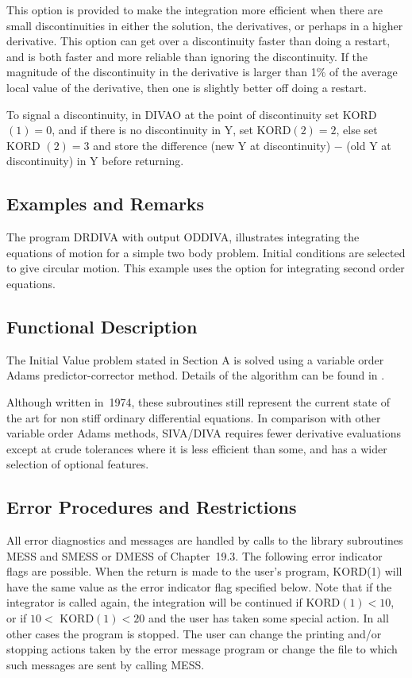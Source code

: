 \documentclass[twoside]{MATH77}
\begin{document}
This option is provided to make the integration more efficient when there
are small discontinuities in either the solution, the derivatives, or
perhaps in a higher derivative. This option can get over a discontinuity
faster than doing a restart, and is both faster and more reliable than
ignoring the discontinuity. If the magnitude of the discontinuity in the
derivative is larger than 1\% of the average local value of the
derivative, then one is slightly better off doing a restart.

To signal a discontinuity, in DIVAO at the point of discontinuity set KORD$%
(1)=0$, and if there is no discontinuity in Y, set KORD$(2)=2$, else set KORD%
$(2)=3$ and store the difference (new Y at discontinuity) $-$ (old Y at
discontinuity) in Y before returning.

\subsection{Examples and Remarks}

The program DRDIVA with output ODDIVA, illustrates integrating the
equations of motion for a simple two body problem.
Initial conditions are selected to give circular motion. This example
uses the option for integrating second order equations.

\subsection{Functional Description}

The Initial Value problem stated in Section A is solved using a variable
order Adams predictor-corrector method. Details of the algorithm can be
found in \cite{Krogh:1974:CSI}.

Although written in~1974, these subroutines still represent the current
state of the art for non stiff ordinary differential equations. In
comparison with other variable order Adams methods, SIVA/DIVA
requires fewer derivative evaluations except at crude tolerances where it is
less efficient than some, and has a wider selection of optional features.




\subsection{Error Procedures and Restrictions}
All error diagnostics and messages are handled by calls to the library
subroutines MESS and SMESS or DMESS of Chapter~19.3. The following error
indicator flags are possible. When the return is made to the user's program,
KORD(1) will have the same value as the error indicator flag specified below.
Note that if the integrator is called again, the integration will be continued
if KORD$(1)<10$, or if $10<$ KORD$(1)<20$ and the user has taken some special
action. In all other cases the program is stopped. The user can change the
printing and/or stopping actions taken by the error message program or change
the file to which such messages are sent by calling MESS.
\end{document}

